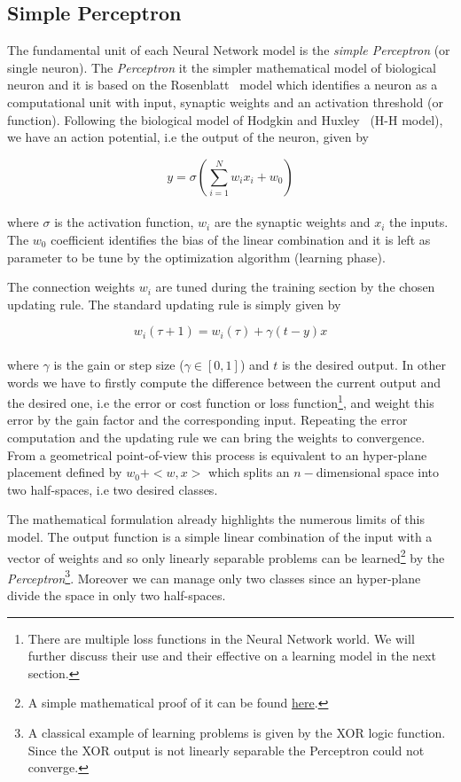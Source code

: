 \documentclass{standalone}
\begin{document}
\subsection[Simple Perceptron]{Simple Perceptron}\label{NN:perceptron}

The fundamental unit of each Neural Network model is the \emph{simple Perceptron} (or single neuron).
The \emph{Perceptron} it the simpler mathematical model of biological neuron and it is based on the Rosenblatt~\cite{Rosenblatt58theperceptron} model which identifies a neuron as a computational unit with input, synaptic weights and an activation threshold (or function).
Following the biological model of Hodgkin and Huxley~\cite{HHmodel} (H-H model), we have an action potential, i.e the output of the neuron, given by

$$
y = \sigma\left(\sum_{i=1}^{N}w_i x_i + w_0 \right)
$$
\\
where $\sigma$ is the activation function, $w_i$ are the synaptic weights and $x_i$ the inputs.
The $w_0$ coefficient identifies the bias of the linear combination and it is left as parameter to be tune by the optimization algorithm (learning phase).

The connection weights $w_i$ are tuned during the training section by the chosen updating rule.
The standard updating rule is simply given by

$$
w_i(\tau + 1) = w_i(\tau) + \gamma(t - y)x
$$
\\
where $\gamma$ is the gain or step size ($\gamma \in [0, 1]$) and $t$ is the desired output.
In other words we have to firstly compute the difference between the current output and the desired one, i.e the error or cost function or loss function\footnote{
  There are multiple loss functions in the Neural Network world.
  We will further discuss their use and their effective on a learning model in the next section.
}, and weight this error by the gain factor and the corresponding input.
Repeating the error computation and the updating rule we can bring the weights to convergence.
From a geometrical point-of-view this process is equivalent to an hyper-plane placement defined by $w_0 + < w, x >$ which splits an $n-$dimensional space into two half-spaces, i.e two desired classes.

The mathematical formulation already highlights the numerous limits of this model.
The output function is a simple linear combination of the input with a vector of weights and so only linearly separable problems can be learned\footnote{
  A simple mathematical proof of it can be found \href{http://www.cs.columbia.edu/~mcollins/courses/6998-2012/notes/perc.converge.pdf}{here}.
} by the \emph{Perceptron}\footnote{
  A classical example of learning problems is given by the XOR logic function.
  Since the XOR output is not linearly separable the Perceptron could not converge.
}.
Moreover we can manage only two classes since an hyper-plane divide the space in only two half-spaces.
\end{document}
